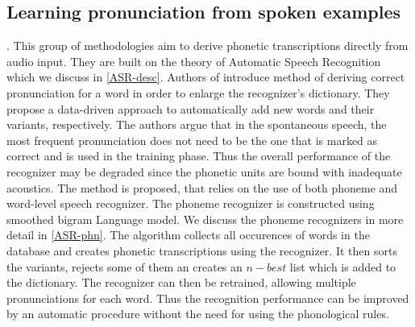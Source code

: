 {\subsection{Learning pronunciation from spoken examples}. 
This group of methodologies aim to derive phonetic transcriptions directly from audio input.
They are built on the theory of Automatic Speech Recognition which we discuss in \ref{ASR-desc}.
Authors of \cite{slobada1996dictionary} introduce method of deriving correct pronunciation for a word in order to enlarge the recognizer's dictionary.
They propose a data-driven approach to automatically add new words and their variants, respectively.
The authors argue that in the spontaneous speech, the most frequent pronunciation does not need to be the one that is marked as correct and is used in the training phase.
Thus the overall performance of the recognizer may be degraded since the phonetic units are bound with inadequate acoustics.
The method is proposed, that relies on the use of both phoneme and word-level speech recognizer.
The phoneme recognizer is constructed using smoothed bigram Language model.
We discuss the phoneme recognizers in more detail in \ref{ASR-phn}.
The algorithm collects all occurences of words in the database and creates phonetic transcriptions using the recognizer.
It then sorts the variants, rejects some of them an creates an $n-best$ list which is added to the dictionary.
The recognizer can then be retrained, allowing multiple pronunciations for each word.
Thus the recognition performance can be improved by an automatic procedure without the need for using the phonological rules.
	
}
